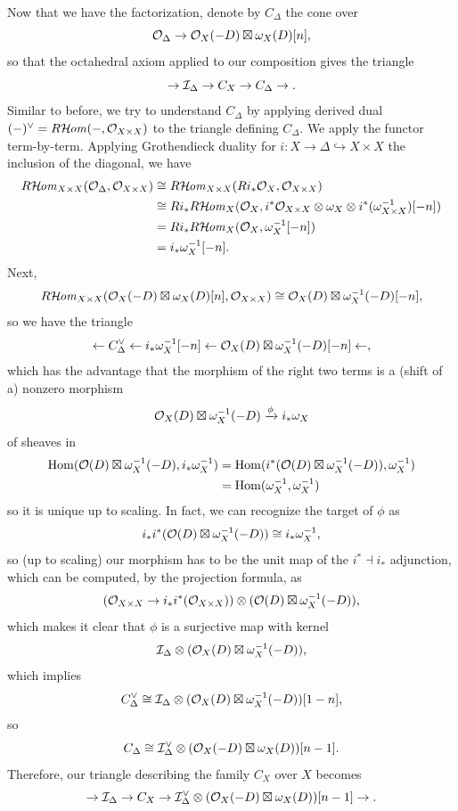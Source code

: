 \documentclass[12pt]{article}
\begin{document}
Now that we have the factorization, denote by $C_\Delta$ the cone over
\[\mathcal{O}_\Delta \to \mathcal{O}_X(-D)\boxtimes \omega_X(D)[n],\]
so that the octahedral axiom applied to our composition gives the triangle
\[\to \mathcal{I}_\Delta \to C_X \to C_\Delta \to.\]
Similar to before, we try to understand $C_\Delta$ by applying derived dual $(-)^\vee = R\mathcal{H}\kern -1pt \mathit{om}(-,\mathcal{O}_{X\times X})$ to the triangle defining $C_\Delta$. We apply the functor term-by-term. Applying Grothendieck duality for $i:X\to \Delta \hookrightarrow X\times X$ the inclusion of the diagonal, we have
\begin{align*}
    R\mathcal{H}\kern -1pt \mathit{om}_{X\times X}(\mathcal{O}_\Delta,\mathcal{O}_{X\times X}) &\cong R\mathcal{H}\kern -1pt \mathit{om}_{X\times X}(Ri_*\mathcal{O}_X, \mathcal{O}_{X\times X})\\
    &\cong Ri_* R\mathcal{H}\kern -1pt \mathit{om}_X(\mathcal{O}_X,i^*\mathcal{O}_{X\times X} \otimes \omega_X \otimes i^*(\omega_{X\times X}^{-1}) [-n])\\
    &= Ri_* R\mathcal{H}\kern -1pt \mathit{om}_X(\mathcal{O}_X,\omega_X^{-1}[-n])\\
    &= i_* \omega_X^{-1}[-n].
\end{align*}
Next,
\[R\mathcal{H}\kern -1pt \mathit{om}_{X\times X}(\mathcal{O}_X(-D)\boxtimes \omega_X(D)[n],\mathcal{O}_{X\times X}) \cong \mathcal{O}_X(D) \boxtimes \omega_X^{-1}(-D)[-n],\]
so we have the triangle
\[\leftarrow C_\Delta^\vee \leftarrow i_* \omega_X^{-1}[-n] \leftarrow \mathcal{O}_X(D) \boxtimes \omega_X^{-1}(-D)[-n] \leftarrow,\]
which has the advantage that the morphism of the right two terms is a (shift of a) nonzero morphism
\[\cO_X(D)\boxtimes \omega_X^{-1}(-D) \xrightarrow{\phi} i_* \omega_X\]
of sheaves in
\begin{align*}
    \mathrm{Hom}(\mathcal{O}(D)\boxtimes \omega_X^{-1}(-D), i_* \omega_X^{-1}) &= \mathrm{Hom}(i^*(\mathcal{O}(D) \boxtimes \omega_X^{-1}(-D)), \omega_X^{-1})\\
    &= \mathrm{Hom}(\omega_X^{-1},\omega_X^{-1})
\end{align*}
so it is unique up to scaling. In fact, we can recognize the target of $\phi$ as
\[i_*i^*(\mathcal{O}(D)\boxtimes \omega_X^{-1}(-D)) \cong i_* \omega_X^{-1},\]
so (up to scaling) our morphism has to be the unit map of the $i^* \dashv i_*$ adjunction, which can be computed, by the projection formula, as
\[(\mathcal{O}_{X\times X} \to i_*i^*(\mathcal{O}_{X\times X})) \otimes (\mathcal{O}(D)\boxtimes \omega_X^{-1}(-D)),\]
which makes it clear that $\phi$ is a surjective map with kernel
\[\mathcal{I}_{\Delta} \otimes (\mathcal{O}_X(D)\boxtimes \omega_X^{-1}(-D)),\]
which implies
\[C_\Delta^\vee \cong \mathcal{I}_{\Delta} \otimes (\mathcal{O}_X(D)\boxtimes \omega_X^{-1}(-D))[1-n],\]
so
\[C_\Delta \cong \mathcal{I}_\Delta^\vee \otimes (\mathcal{O}_X(-D)\boxtimes \omega_X(D))[n-1].\]
Therefore, our triangle describing the family $C_X$ over $X$ becomes
\[\to \mathcal{I}_\Delta \to C_X \to \mathcal{I}_\Delta^\vee \otimes (\mathcal{O}_X(-D) \boxtimes \omega_X(D))[n-1] \to.\]
\end{document}
